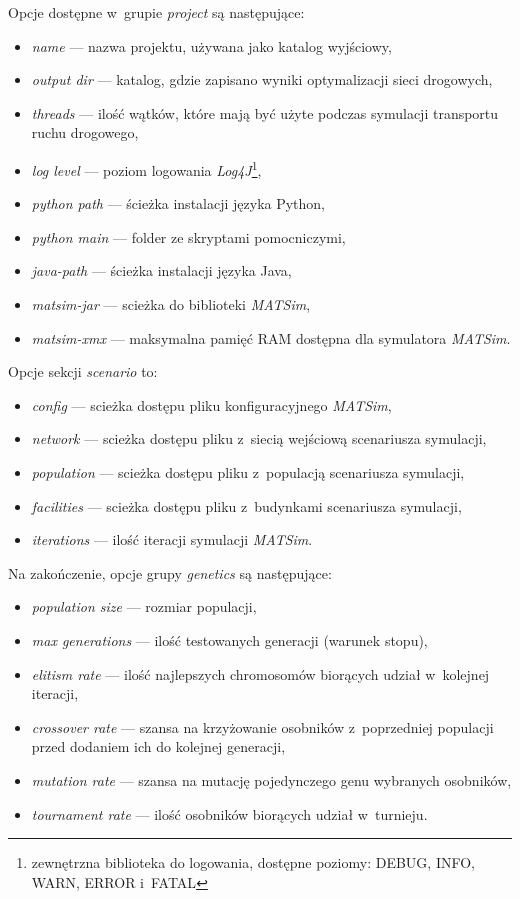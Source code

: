 \documentclass[twoside,12pt]{report}
\begin{document}
Opcje dostępne w~grupie \textit{project} są następujące:
\begin{itemize}
\item \textit{name} --- nazwa projektu, używana jako katalog wyjściowy,
\item \textit{output dir} --- katalog, gdzie zapisano wyniki optymalizacji sieci drogowych,
\item \textit{threads} --- ilość wątków, które mają być użyte podczas symulacji transportu ruchu drogowego,
\item \textit{log level} --- poziom logowania \textit{Log4J}\footnote{zewnętrzna biblioteka do logowania, dostępne poziomy: DEBUG, INFO, WARN, ERROR i~FATAL},
\item \textit{python path} --- ścieżka instalacji języka Python,
\item \textit{python main} --- folder ze skryptami pomocniczymi,
\item \textit{java-path} --- ścieżka instalacji języka Java,
\item \textit{matsim-jar} --- scieżka do biblioteki \textit{MATSim},
\item \textit{matsim-xmx} --- maksymalna pamięć RAM dostępna dla symulatora \textit{MATSim}.
\end{itemize}

Opcje sekcji \textit{scenario} to:
\begin{itemize}
\item \textit{config} --- scieżka dostępu pliku konfiguracyjnego \textit{MATSim},
\item \textit{network} --- scieżka dostępu pliku z~siecią wejściową scenariusza symulacji,
\item \textit{population} --- scieżka dostępu pliku z~populacją scenariusza symulacji,
\item \textit{facilities} --- scieżka dostępu pliku z~budynkami scenariusza symulacji,
\item \textit{iterations} --- ilość iteracji symulacji \textit{MATSim}.
\end{itemize}

Na zakończenie, opcje grupy \textit{genetics} są następujące:
\begin{itemize}
\item \textit{population size} --- rozmiar populacji,
\item \textit{max generations} --- ilość testowanych generacji (warunek stopu),
\item \textit{elitism rate} --- ilość najlepszych chromosomów biorących udział w~kolejnej iteracji,
\item \textit{crossover rate} --- szansa na krzyżowanie osobników z~poprzedniej populacji przed dodaniem ich do kolejnej generacji,
\item \textit{mutation rate} --- szansa na mutację pojedynczego genu wybranych osobników,
\item \textit{tournament rate} --- ilość osobników biorących udział w~turnieju.
\end{itemize}
\end{document}
